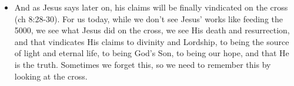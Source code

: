 \begin{itemize}
  \item{And as Jesus says later on, his claims will be finally vindicated on the cross (ch 8:28-30). For us today, while we don’t see Jesus’ works like feeding the 5000, we see what Jesus did on the cross, we see His death and resurrection, and that vindicates His claims to divinity and Lordship, to being the source of light and eternal life, to being God’s Son, to being our hope, and that He is the truth. Sometimes we forget this, so we need to remember this by looking at the cross.}
\end{itemize}